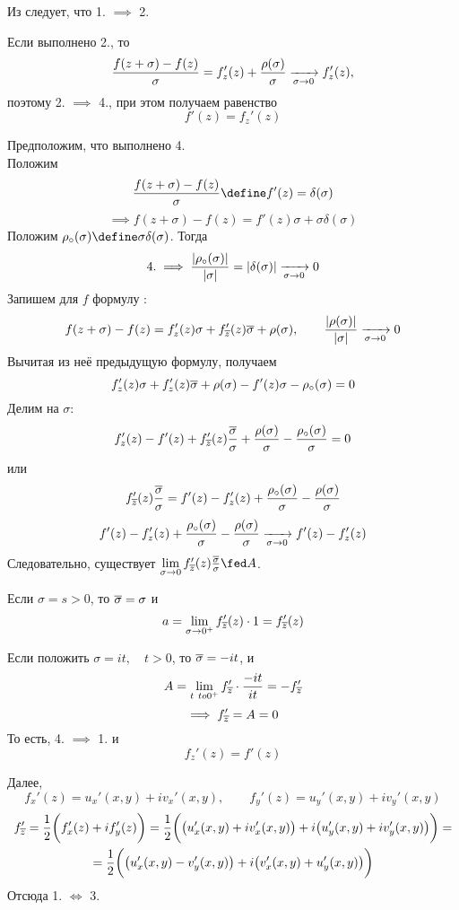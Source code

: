 \begin{iproof}
	\item Из  следует, что 1. $ \implies $ 2.
	\item Если выполнено 2., то
	$$ \frac{f(z + \sigma) - f(z)}\sigma = f_z'(z) + \frac{\rho(\sigma)}\sigma \xrightarrow[\sigma \to 0]{} f_z'(z), $$
	поэтому 2. $ \implies $ 4., при этом получаем равенство
	$$ f'(z) = f_z'(z) $$
	\item Предположим, что выполнено 4. \\
	Положим
	$$ \frac{f(z + \sigma) - f(z)}\sigma \define f'(z) = \delta(\sigma) $$
	$$ \implies f(z + \sigma) - f(z) = f'(z) \sigma + \sigma \delta(\sigma) $$
	Положим $ \rho_\circ(\sigma) \define \sigma\delta(\sigma) $. Тогда
	$$ 4. \implies \frac{|\rho_\circ(\sigma)|}{|\sigma|} = |\delta(\sigma)| \xrightarrow[\sigma \to 0]{} 0 $$
	Запишем для $ f $ формулу :
	$$ f(z + \sigma) - f(z) = f_z'(z)\sigma + f_{\overline z}'(z) \overline \sigma + \rho(\sigma), \qquad \frac{|\rho(\sigma)|}{|\sigma|} \xrightarrow[\sigma \to 0]{} 0 $$
	Вычитая из неё предыдущую формулу, получаем
	$$ f_z'(z) \sigma + f_z' (z) \overline \sigma + \rho(\sigma) - f'(z)\sigma - \rho_\circ(\sigma) = 0 $$
	Делим на $ \sigma $:
	$$ f_z'(z) - f'(z) + f_{\overline z}'(z) \frac{\overline \sigma}\sigma + \frac{\rho(\sigma)}\sigma - \frac{\rho_\circ(\sigma)}\sigma = 0 $$
	или
	$$ f_{\overline z}'(z) \frac{\overline \sigma}\sigma = f'(z) - f_z'(z) + \frac{\rho_\circ(\sigma)}\sigma - \frac{\rho(\sigma)}\sigma $$
	$$ f'(z) - f_z'(z) + \frac{\rho_\circ(\sigma)}\sigma - \frac{\rho(\sigma)}\sigma \xrightarrow[\sigma \to 0]{} f'(z) - f_z'(z) $$
	Следовательно, существует $ \limz\sigma f_{\ol z}'(z) \frac{\ol \sigma}\sigma \fed A $.

	Если $ \sigma = s > 0 $, то $ \overline \sigma = \sigma $ и
	$$ a = \lim\limits_{\sigma \to 0^+} f_{\overline z}'(z) \cdot 1 = f_{\overline z}'(z) $$

	Если положить $ \sigma = it, \quad t > 0 $, то $ \overline \sigma = -it $, и
	$$ A = \lim\limits_{t\ to 0^+} f_{\overline z}' \cdot \frac{-it}{it} = -f_{\overline z}' $$
	$$ \implies f_{\overline z}' = A = 0 $$
	То есть, 4. $ \implies $ 1. и
	$$ f_z'(z) = f'(z) $$

	\item Далее,
	$$ f_x'(z) = u_x'(x, y) + iv_x'(x, y), \qquad f_y'(z) = u_y'(x, y) + iv_y'(x, y) $$
	\begin{multline*}
		f_{\overline z}' = \frac12 \bigg( f_x'(z) + if_y'(z) \bigg) = \frac12 \bigg( \big( u_x'(x, y) + iv_x'(x, y) \big) + i \big( u_y'(x, y) + iv_y'(x, y) \big) \bigg) = \\
		= \frac12 \bigg( \big( u_x'(x, y) - v_y'(x, y) \big) + i \big( v_x'(x, y) + u_y'(x, y) \big) \bigg)
	\end{multline*}
	Отсюда 1. $ \iff $ 3.
\end{iproof}

